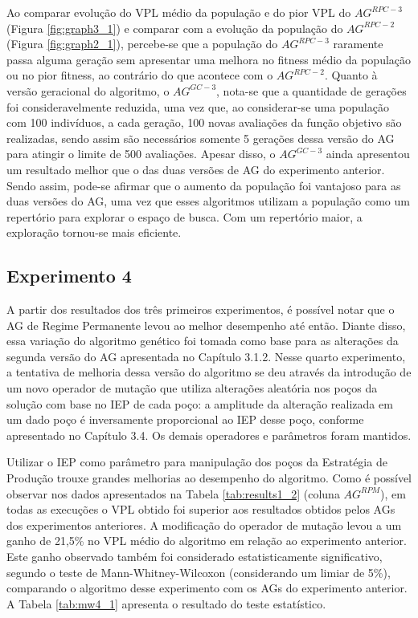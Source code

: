 Ao comparar evolução do VPL médio da população e do pior VPL do $AG^{RPC-3}$ (Figura \ref{fig:graph3_1}) e comparar com a evolução da população do $AG^{RPC-2}$ (Figura \ref{fig:graph2_1}), percebe-se que a população do $AG^{RPC-3}$ raramente passa alguma geração sem apresentar uma melhora no fitness médio da população ou no pior fitness, ao contrário do que acontece com o $AG^{RPC-2}$. Quanto à versão geracional do algoritmo, o $AG^{GC-3}$, nota-se que a quantidade de gerações foi consideravelmente reduzida, uma vez que, ao considerar-se uma população com 100 indivíduos, a cada geração, 100 novas avaliações da função objetivo são realizadas, sendo assim são necessários somente 5 gerações dessa versão do AG para atingir o limite de 500 avaliações. Apesar disso, o $AG^{GC-3}$ ainda apresentou um resultado melhor que o das duas versões de AG do experimento anterior. Sendo assim, pode-se afirmar que o aumento da população foi vantajoso para as duas versões do AG, uma vez que esses algoritmos utilizam a população como um repertório para explorar o espaço de busca. Com um repertório maior, a exploração tornou-se mais eficiente.

\subsection{Experimento 4}

A partir dos resultados dos três primeiros experimentos, é possível notar que o AG de Regime Permanente levou ao melhor desempenho até então. Diante disso, essa variação do algoritmo genético foi tomada como base para as alterações da segunda versão do AG apresentada no Capítulo 3.1.2.  Nesse quarto experimento, a tentativa de melhoria dessa versão do algoritmo se deu através da introdução de um novo operador de mutação que utiliza alterações aleatória nos poços da solução com base no IEP de cada poço: a amplitude da alteração realizada em um dado poço é inversamente proporcional ao IEP desse poço, conforme apresentado no Capítulo 3.4. Os demais operadores e parâmetros foram mantidos.

Utilizar o IEP como parâmetro para manipulação dos poços da Estratégia de Produção trouxe grandes melhorias ao desempenho do algoritmo. Como é possível observar nos dados apresentados na Tabela \ref{tab:results1_2} (coluna $AG^{RPM}$), em todas as execuções o VPL obtido foi superior aos resultados obtidos pelos AGs dos experimentos anteriores. A modificação do operador de mutação levou a um ganho de 21,5\% no VPL médio do algoritmo em relação ao experimento anterior. Este ganho observado também foi considerado estatisticamente significativo, segundo o teste de Mann-Whitney-Wilcoxon (considerando um limiar de 5\%), comparando o algoritmo desse experimento com os AGs do experimento anterior. A Tabela \ref{tab:mw4_1} apresenta o resultado do teste estatístico.

